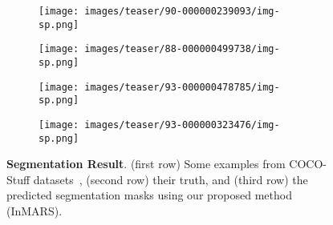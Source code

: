 \documentclass[letterpaper, 10 pt, journal, twoside]{IEEEtran}
\begin{document}
\begin{figure}
    \par\smallskip
    \centering
    \begin{subfigure}[t]{0.11\textwidth}
      \texttt{[image: images/teaser/90-000000239093/img-sp.png]}
    \end{subfigure}
    \begin{subfigure}[t]{0.11\textwidth}
      \texttt{[image: images/teaser/88-000000499738/img-sp.png]}
    \end{subfigure}
    \begin{subfigure}[t]{0.11\textwidth}
      \texttt{[image: images/teaser/93-000000478785/img-sp.png]}
    \end{subfigure}
    \begin{subfigure}[t]{0.11\textwidth}
      \texttt{[image: images/teaser/93-000000323476/img-sp.png]}
    \end{subfigure}
    
    \caption{\textbf{Segmentation Result}. (first row) Some examples from COCO-Stuff datasets~\cite{Cocostuff}, (second row) their truth, and (third row) the predicted segmentation masks using our proposed method (InMARS).}
    \label{fig:teaser:coco-st3}
  \end{figure}
  
\end{document}
